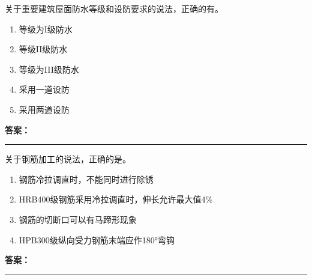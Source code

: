 \documentclass[UTF8,fontset=fandol,11pt]{ctexart}
\newcommand{\answerline}{\textcolor{answerred}{\rule{2.4cm}{0.7pt}}}
\begin{document}
\begin{quizbox}[title={乱序第 54 题｜第九章防水工程}]

关于重要建筑屋面防水等级和设防要求的说法，正确的有。\\

\begin{enumerate}[label=\Alph*.]

\item 等级为I级防水

\item 等级II级防水

\item 等级为III级防水

\item 采用一道设防

\item 采用两道设防

\end{enumerate}

\textbf{\textcolor{answerred}{答案：}} \answerline

\end{quizbox}

\vspace{0.2em}

\begin{quizbox}[title={乱序第 55 题｜第四章混凝土结构工程}]

关于钢筋加工的说法，正确的是。\\

\begin{enumerate}[label=\Alph*.]

\item 钢筋冷拉调直时，不能同时进行除锈

\item HRB400级钢筋采用冷拉调直时，伸长允许最大值4\%

\item 钢筋的切断口可以有马蹄形现象

\item HPB300级纵向受力钢筋末端应作180°弯钩

\end{enumerate}

\textbf{\textcolor{answerred}{答案：}} \answerline

\end{quizbox}

\vspace{0.2em}
\end{document}
